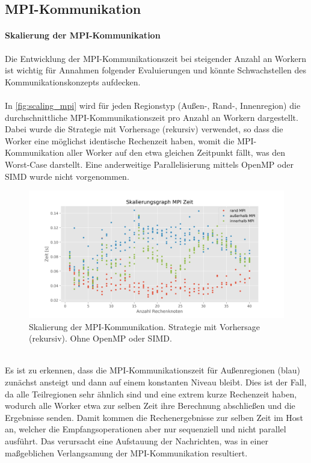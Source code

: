 \subsection{MPI-Kommunikation}

\paragraph{Skalierung der MPI-Kommunikation}

Die Entwicklung der MPI-Kommunikationszeit bei steigender Anzahl an Workern ist wichtig für Annahmen folgender Evaluierungen und könnte Schwachstellen des Kommunikationskonzepts aufdecken.
\\
\\
In \autoref{fig:scaling_mpi} wird für jeden Regionstyp (Außen-, Rand-, Innenregion) die durchschnittliche MPI-Kommunikationszeit pro Anzahl an Workern dargestellt. Dabei wurde die Strategie mit Vorhersage (rekursiv) verwendet, so dass die Worker eine möglichst identische Rechenzeit haben, womit die MPI-Kommunikation aller Worker auf den etwa gleichen Zeitpunkt fällt, was den Worst-Case darstellt. Eine anderweitige Parallelisierung mittels OpenMP oder SIMD wurde nicht vorgenommen.
\\
\begin{figure}[h!]
	\centering
	\includegraphics[width=0.9\linewidth]{img/Evaluation/scaling_mpi.png}
	\caption{Skalierung der MPI-Kommunikation. Strategie mit Vorhersage (rekursiv). Ohne OpenMP oder SIMD.}
	\label{fig:scaling_mpi}
\end{figure}
\\
Es ist zu erkennen, dass die MPI-Kommunikationszeit für Außenregionen (blau) zunächst ansteigt und dann auf einem konstanten Niveau bleibt.
Dies ist der Fall, da alle Teilregionen sehr ähnlich sind und eine extrem kurze Rechenzeit haben, wodurch alle Worker etwa zur selben Zeit ihre Berechnung abschließen und die Ergebnisse senden. Damit kommen die Rechenergebnisse zur selben Zeit im Host an, welcher die Empfangsoperationen aber nur sequenziell und nicht parallel ausführt. Das verursacht eine Aufstauung der Nachrichten, was in einer maßgeblichen Verlangsamung der MPI-Kommunikation resultiert.

